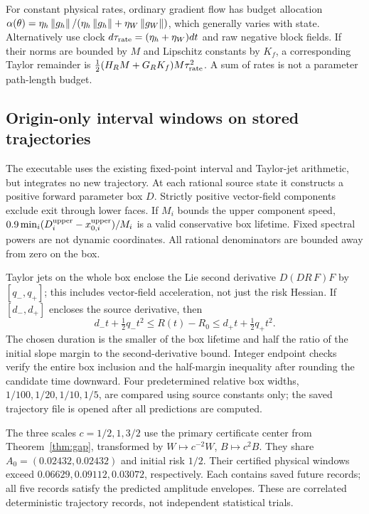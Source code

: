 For constant physical rates, ordinary gradient flow has budget allocation $\alpha(\theta)=\eta_h\left\lVert g_h\right\rVert/(\eta_h\left\lVert g_h\right\rVert+\eta_W\left\lVert g_W\right\rVert)$, which generally varies with state. Alternatively use clock $d\tau_{\rm rate}=(\eta_h+\eta_W)dt$ and raw negative block fields. If their norms are bounded by $M$ and Lipschitz constants by $K_f$, a corresponding Taylor remainder is $\tfrac12(H_RM+G_RK_f)M\tau_{\rm rate}^2$. A sum of rates is not a parameter path-length budget.

\subsection{Origin-only interval windows on stored trajectories}
\label{app:origin-windows}
The executable  uses the existing fixed-point interval and Taylor-jet arithmetic, but integrates no new trajectory. At each rational source state it constructs a positive forward parameter box $D$. Strictly positive vector-field components exclude exit through lower faces. If $M_i$ bounds the upper component speed, $0.9\min_i(D_i^{\rm upper}-x_{0,i}^{\rm upper})/M_i$ is a valid conservative box lifetime. Fixed spectral powers are not dynamic coordinates. All rational denominators are bounded away from zero on the box.

Taylor jets on the whole box enclose the Lie second derivative $D(DR\,F)F$ by $[q_-,q_+]$; this includes vector-field acceleration, not just the risk Hessian. If $[d_-,d_+]$ encloses the source derivative, then
\begin{equation}
 d_-t+\tfrac12q_-t^2\le R(t)-R_0
 \le d_+t+\tfrac12q_+t^2.
\end{equation}
The chosen duration is the smaller of the box lifetime and half the ratio of the initial slope margin to the second-derivative bound. Integer endpoint checks verify the entire box inclusion and the half-margin inequality after rounding the candidate time downward. Four predetermined relative box widths, $1/100,1/20,1/10,1/5$, are compared using source constants only; the saved trajectory file is opened after all predictions are computed.

The three scales $c=1/2,1,3/2$ use the primary certificate center from Theorem~\ref{thm:gap}, transformed by $W\mapsto c^{-2}W$, $B\mapsto c^2B$. They share $A_0=(0.02432,0.02432)$ and initial risk $1/2$. Their certified physical windows exceed $0.06629,0.09112,0.03072$, respectively. Each contains saved future records; all five records satisfy the predicted amplitude envelopes. These are correlated deterministic trajectory records, not independent statistical trials.


